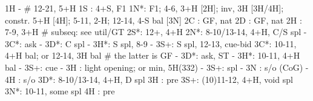 1H -  # 12-21, 5+H
1S : 4+S, F1
1N*: F1; 4-6, 3+H [2H]; inv, 3H [3H/4H]; constr. 5+H [4H]; 5-11, 2-H; 12-14, 4-S bal [3N]
2C : GF, nat
2D : GF, nat
2H : 7-9, 3+H  # subseq: see util/GT
2S*: 12+, 4+H
2N*: 8-10/13-14, 4+H, C/S spl
   - 3C*: ask
        - 3D*: C spl
        - 3H*: S spl, 8-9
        - 3S+: S spl, 12-13, cue-bid
3C*: 10-11, 4+H bal; or 12-14, 3H bal  # the latter is GF
   - 3D*: ask, ST
        - 3H*: 10-11, 4+H bal
        - 3S+: cue
   - 3H : light opening; or min, 5H(332)
   - 3S+: spl
   - 3N : s/o (CoG)
   - 4H : s/o
3D*: 8-10/13-14, 4+H, D spl
3H : pre
3S+: (10)11-12, 4+H, void spl
3N*: 10-11, some spl
4H : pre